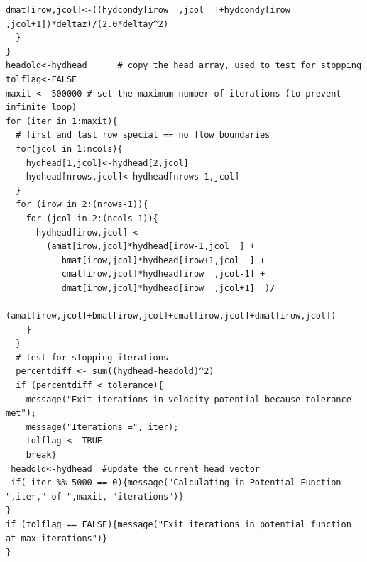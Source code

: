 \begin{lstlisting}[caption= Velocity Potential Script , label=lst:2DinclusionVelocity]
    dmat[irow,jcol]<-((hydcondy[irow  ,jcol  ]+hydcondy[irow  ,jcol+1])*deltaz)/(2.0*deltay^2)
  }
}
headold<-hydhead      # copy the head array, used to test for stopping 
tolflag<-FALSE
maxit <- 500000 # set the maximum number of iterations (to prevent infinite loop)
for (iter in 1:maxit){
  # first and last row special == no flow boundaries
  for(jcol in 1:ncols){
    hydhead[1,jcol]<-hydhead[2,jcol]
    hydhead[nrows,jcol]<-hydhead[nrows-1,jcol]
  }
  for (irow in 2:(nrows-1)){
    for (jcol in 2:(ncols-1)){
      hydhead[irow,jcol] <- 
        (amat[irow,jcol]*hydhead[irow-1,jcol  ] +
           bmat[irow,jcol]*hydhead[irow+1,jcol  ] +
           cmat[irow,jcol]*hydhead[irow  ,jcol-1] +
           dmat[irow,jcol]*hydhead[irow  ,jcol+1]  )/
        (amat[irow,jcol]+bmat[irow,jcol]+cmat[irow,jcol]+dmat[irow,jcol])
    }
  }
  # test for stopping iterations
  percentdiff <- sum((hydhead-headold)^2)
  if (percentdiff < tolerance){
    message("Exit iterations in velocity potential because tolerance met");
    message("Iterations =", iter);
    tolflag <- TRUE
    break}
 headold<-hydhead  #update the current head vector
 if( iter %% 5000 == 0){message("Calculating in Potential Function ",iter," of ",maxit, "iterations")}
}
if (tolflag == FALSE){message("Exit iterations in potential function at max iterations")}
}\end{lstlisting}








